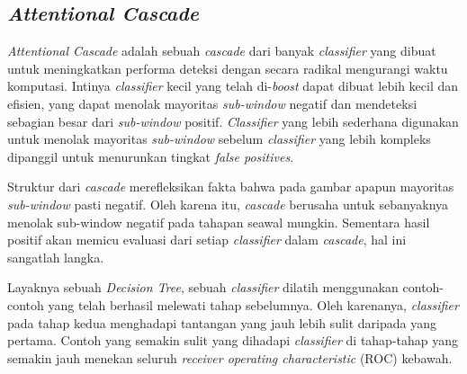 \subsection{\emph{Attentional Cascade}}

\emph{Attentional Cascade} adalah sebuah \emph{cascade} dari banyak 
\emph{classifier} yang dibuat untuk meningkatkan performa deteksi dengan secara radikal mengurangi waktu 
komputasi. Intinya \emph{classifier} kecil yang telah di-\emph{boost} dapat dibuat lebih 
kecil dan efisien, yang dapat menolak mayoritas \emph{sub-window} negatif dan 
mendeteksi sebagian besar dari \emph{sub-window} positif. \emph{Classifier} yang lebih 
sederhana digunakan untuk menolak mayoritas \emph{sub-window} sebelum \emph{classifier} 
yang lebih kompleks dipanggil untuk menurunkan tingkat \emph{false positives}.

Struktur dari \emph{cascade} merefleksikan 
fakta bahwa pada gambar apapun mayoritas \emph{sub-window} pasti negatif. 
Oleh karena itu, \emph{cascade} berusaha untuk sebanyaknya menolak sub-window 
negatif pada tahapan seawal mungkin. Sementara hasil positif 
akan memicu evaluasi dari setiap \emph{classifier} dalam \emph{cascade}, 
hal ini sangatlah langka.

Layaknya sebuah \emph{Decision Tree}, sebuah \emph{classifier} dilatih menggunakan 
contoh-contoh yang telah berhasil melewati tahap sebelumnya. Oleh karenanya, 
\emph{classifier} pada tahap kedua menghadapi tantangan yang jauh lebih sulit 
daripada yang pertama. Contoh yang semakin sulit yang dihadapi \emph{classifier} 
di tahap-tahap yang semakin jauh menekan seluruh \emph{receiver operating characteristic} (ROC) 
kebawah.

